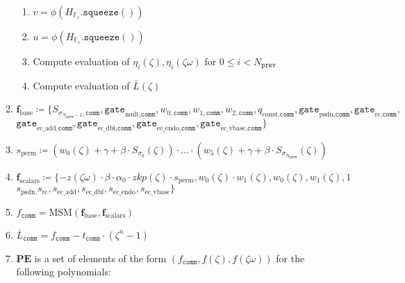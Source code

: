 \begin{algorithm}[H]
\begin{enumerate}
\begin{enumerate}
\begin{enumerate}
                \item $v = \phi(H_{\mathbb{F}_r}.\texttt{squeeze}())$
                \item $u = \phi(H_{\mathbb{F}_r}.\texttt{squeeze}())$
                \item Compute evaluation of $\eta_i(\zeta), \eta_i(\zeta\omega)$ for $0 \leq i < N_{\texttt{prev}}$
                \item Compute evaluation of $\bar{L}(\zeta)$
            \end{enumerate}
            \item $\textbf{f}_{\text{base}} \coloneqq
            \{S_{\sigma_{N_{\texttt{perm}} - 1}, \texttt{comm}}, %
            \texttt{gate}_{\text{mult}, \texttt{comm}}, w_{0, \texttt{comm}}, w_{1, \texttt{comm}}, w_{2, \texttt{comm}}, q_{\text{const}, \texttt{comm}}, %
            \texttt{gate}_{\text{psdn}, \texttt{comm}}, \texttt{gate}_{\text{rc}, \texttt{comm}},$\\ %
            $\texttt{gate}_{\text{ec\_add}, \texttt{comm}}, %
            \texttt{gate}_{\text{ec\_dbl}, \texttt{comm}}, %
            \texttt{gate}_{\text{ec\_endo}, \texttt{comm}}, %
            \texttt{gate}_{\text{ec\_vbase}, \texttt{comm}} %
            \}$
            \item $s_{\text{perm}} \coloneqq (w_0(\zeta) + \gamma + \beta \cdot S_{\sigma_0}(\zeta)) \cdot ...
            \cdot (w_5(\zeta) + \gamma + \beta \cdot S_{\sigma_{N_{\texttt{perm}}}}(\zeta))$
            \item $\textbf{f}_{\text{scalars}} \coloneqq
            \{-z(\zeta\omega) \cdot \beta \cdot \alpha_0 \cdot zkp(\zeta) \cdot s_{\text{perm}}, %
            w_0(\zeta) \cdot w_1(\zeta), w_0(\zeta), w_1(\zeta), 1$ \\ %
            $s_{\text{psdn},} s_{\text{rc}}, %
            s_{\text{ec\_add}}, %
            s_{\text{ec\_dbl}}, %
            s_{\text{ec\_endo}}, %
            s_{\text{ec\_vbase}} %
            \}$
            \item $f_{\texttt{comm}} = \text{MSM}(\textbf{f}_{\text{base}}, \textbf{f}_{\text{scalars}})$
            \item $\bar{L}_{\texttt{comm}} = f_{\texttt{comm}} - t_{\texttt{comm}} \cdot (\zeta^n - 1)$
            \item $\textbf{PE}$ is a set of elements of the form $(f_{\texttt{comm}}, f(\zeta), f(\zeta\omega))$ for the following polynomials:

\end{enumerate}
\end{enumerate}
\end{algorithm}
